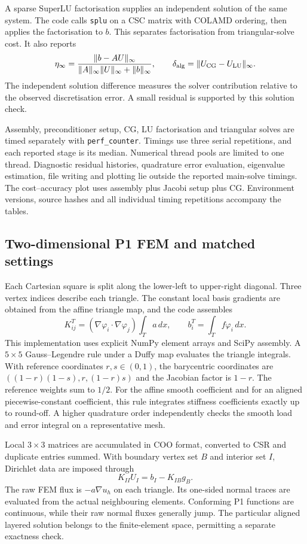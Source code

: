 A sparse SuperLU factorisation supplies an independent solution of the same system. The code calls \texttt{splu} on a CSC matrix with COLAMD ordering, then applies the factorisation to $b$. This separates factorisation from triangular-solve cost. It also reports
\[
\eta_\infty=
\frac{\|b-AU\|_\infty}{\|A\|_\infty\|U\|_\infty+\|b\|_\infty},
\qquad
\delta_{\rm alg}=\|U_{\rm CG}-U_{\rm LU}\|_\infty.
\]
The independent solution difference measures the solver contribution relative to the observed discretisation error. A small residual is supported by this solution check.

Assembly, preconditioner setup, CG, LU factorisation and triangular solves are timed separately with \texttt{perf\_counter}. Timings use three serial repetitions, and each reported stage is its median. Numerical thread pools are limited to one thread. Diagnostic residual histories, quadrature error evaluation, eigenvalue estimation, file writing and plotting lie outside the reported main-solve timings. The cost--accuracy plot uses assembly plus Jacobi setup plus CG. Environment versions, source hashes and all individual timing repetitions accompany the tables.

\subsection{Two-dimensional P1 FEM and matched settings}
Each Cartesian square is split along the lower-left to upper-right diagonal. Three vertex indices describe each triangle. The constant local basis gradients are obtained from the affine triangle map, and the code assembles
\[
K_{ij}^{T}=(\nabla\varphi_i\cdot\nabla\varphi_j)\int_T a\,dx,
\qquad b_i^T=\int_Tf\varphi_i\,dx.
\]
This implementation uses explicit NumPy element arrays and SciPy assembly. A $5\times5$ Gauss--Legendre rule under a Duffy map evaluates the triangle integrals. With reference coordinates $r,s\in(0,1)$, the barycentric coordinates are $((1-r)(1-s),r,(1-r)s)$ and the Jacobian factor is $1-r$. The reference weights sum to $1/2$. For the affine smooth coefficient and for an aligned piecewise-constant coefficient, this rule integrates stiffness coefficients exactly up to round-off. A higher quadrature order independently checks the smooth load and error integral on a representative mesh.

Local $3\times3$ matrices are accumulated in COO format, converted to CSR and duplicate entries summed. With boundary vertex set $B$ and interior set $I$, Dirichlet data are imposed through
\[
K_{II}U_I=b_I-K_{IB}g_B.
\]
The raw FEM flux is $-a\nabla u_h$ on each triangle. Its one-sided normal traces are evaluated from the actual neighbouring elements. Conforming P1 functions are continuous, while their raw normal fluxes generally jump. The particular aligned layered solution belongs to the finite-element space, permitting a separate exactness check.

